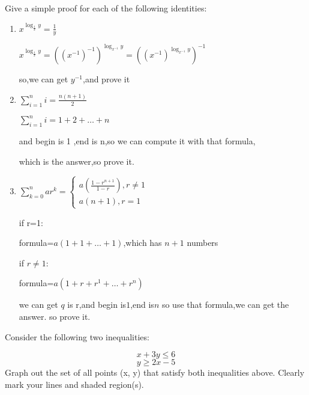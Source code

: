 \documentclass[11pt]{article}
\begin{document}
\begin{subparts}
    \item Give a simple proof for each of the following identities:
    \begin{enumerate}[(i.)]
        \item $x^{\log_\frac{1}{x}y}= \frac{1}{y}$ \par
        \begin{solution}
            $x^{\log_\frac{1}{x}y}= ((x^{-1})^{-1})^{\log_{x^{-1}}y}=((x^{-1})^{\log_{x^{-1}}y})^{-1}$ \par
            so,we can get $y^{-1}$,and prove it
        \end{solution}
        \item $\sum_{i = 1}^{n}i=\frac{n(n+1)}{2}$ \par
        \begin{solution}
            $\sum_{i = 1}^{n}i=1+2+\dots+n$ \par
            and begin is 1 ,end is n,so we can compute it with that formula, \par
            which is the answer,so prove it.
        \end{solution}
        \item $\sum_{k = 0}^{n}ar^k= 
        \begin{cases}
          a(\frac{1-r^{n+1}}{1-r}),r \neq 1 \\
          a(n+1), r=1
        \end{cases}
        $ \par
        \begin{solution}
            if r=1: \par
            formula=$a(1+1+\dots+1)$,which has $n+1$ numbers \par
            if $r \neq 1$:\par
            formula=$a(1+r+r^{1}+\dots+r^{n})$ \par
            we can get $q$ is r,and begin is$1$,end is$n$
            so use that formula,we can get the answer.
            so prove it.
        \end{solution}
    \end{enumerate}

    \item Consider the following two inequalities: \par
        $$x+3y\leqslant 6$$ 
        $$y\geqslant 2x-5 $$
        Graph out the set of all points (x, y) that satisfy both inequalities above. Clearly mark
your lines and shaded region(s). \\
\begin{tikzpicture}[scale=0.6]  
    

\end{tikzpicture}
\end{subparts}
\end{document}
